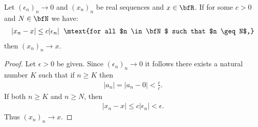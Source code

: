     \begin{theorem}
        Let $(\epsilon_n)_n \rightarrow 0$ and $(x_n)_n$ be real sequences and $x \in \bfR$. If for some $c>0$ and $N \in \bfN$ we have:
            \begin{equation*}
            \begin{split}
                |x_n - x| \leq c|\epsilon_n| \hspace{6pt}\mtext{for all $n \in \bfN$ such that $n \geq N$,}
            \end{split}
            \end{equation*}
        then $(x_n)_n \rightarrow x$.
    \end{theorem}
        {\color{red} \begin{proof}
            Let $\epsilon > 0$ be given. Since $(\epsilon_n)_n \rightarrow 0$ it follows there exists a natural number $K$ such that if $n \geq K$ then
                \begin{equation*}
                \begin{split}
                    |a_n| = |a_n - 0| < \frac{\epsilon}{c}.
                \end{split}
                \end{equation*}
            If both $n \geq K$ and $n\geq N$, then
                \begin{equation*}
                \begin{split}
                    |x_n - x| \leq c|\epsilon_n| < \epsilon.
                \end{split}
                \end{equation*}
            Thus $(x_n)_n \rightarrow x$.
        \end{proof}}
    
